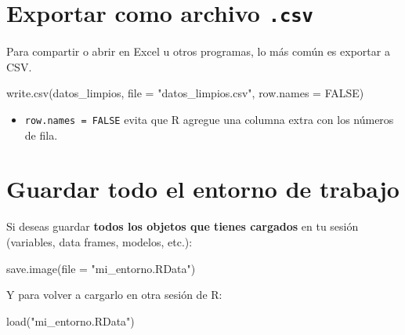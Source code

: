 \documentclass[
  letterpaper,
  DIV=11,
  numbers=noendperiod,
  twoside]{scrreprt}
\newenvironment{Shaded}{\begin{snugshade}}{\end{snugshade}}
\newcommand{\AttributeTok}[1]{\textcolor[rgb]{0.40,0.45,0.13}{#1}}
\newcommand{\ConstantTok}[1]{\textcolor[rgb]{0.56,0.35,0.01}{#1}}
\newcommand{\FunctionTok}[1]{\textcolor[rgb]{0.28,0.35,0.67}{#1}}
\newcommand{\NormalTok}[1]{\textcolor[rgb]{0.00,0.23,0.31}{#1}}
\newcommand{\StringTok}[1]{\textcolor[rgb]{0.13,0.47,0.30}{#1}}
\providecommand{\tightlist}{%
  \setlength{\itemsep}{0pt}\setlength{\parskip}{0pt}}\usepackage{longtable,booktabs,array}
\begin{document}
\section{\texorpdfstring{Exportar como archivo
\texttt{.csv}}{Exportar como archivo .csv}}\label{exportar-como-archivo-.csv}

Para compartir o abrir en Excel u otros programas, lo más común es
exportar a CSV.

\begin{Shaded}
\begin{Highlighting}[]
\FunctionTok{write.csv}\NormalTok{(datos\_limpios, }
          \AttributeTok{file =} \StringTok{"datos\_limpios.csv"}\NormalTok{, }
          \AttributeTok{row.names =} \ConstantTok{FALSE}\NormalTok{)}
\end{Highlighting}
\end{Shaded}

\begin{itemize}
\tightlist
\item
  \texttt{row.names\ =\ FALSE} evita que R agregue una columna extra con
  los números de fila.
\end{itemize}

\section{Guardar todo el entorno de
trabajo}\label{guardar-todo-el-entorno-de-trabajo}

Si deseas guardar \textbf{todos los objetos que tienes cargados} en tu
sesión (variables, data frames, modelos, etc.):

\begin{Shaded}
\begin{Highlighting}[]
\FunctionTok{save.image}\NormalTok{(}\AttributeTok{file =} \StringTok{"mi\_entorno.RData"}\NormalTok{)}
\end{Highlighting}
\end{Shaded}

Y para volver a cargarlo en otra sesión de R:

\begin{Shaded}
\begin{Highlighting}[]
\FunctionTok{load}\NormalTok{(}\StringTok{"mi\_entorno.RData"}\NormalTok{)}
\end{Highlighting}
\end{Shaded}
\end{document}
